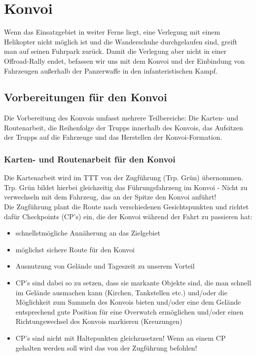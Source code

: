 \pagebreak
\section{Konvoi}
	Wenn das Einsatzgebiet in weiter Ferne liegt, eine Verlegung mit einem Helikopter nicht möglich ist und die Wanderschuhe durchgelaufen sind, greift man auf seinen Fuhrpark zurück. Damit die Verlegung aber nicht in einer Offroad-Rally endet, befassen wir uns mit dem Konvoi und der Einbindung von Fahrzeugen außerhalb der Panzerwaffe in den infanteristischen Kampf. 

\subsection{Vorbereitungen für den Konvoi}
	Die Vorbereitung des Konvois umfasst mehrere Teilbereiche: Die Karten- und Routenarbeit, die Reihenfolge der Trupps innerhalb des Konvois, das Aufsitzen der Trupps auf die Fahrzeuge und das Herstellen der Konvoi-Formation.

\subsubsection{Karten- und Routenarbeit für den Konvoi}
	Die Kartenarbeit wird im TTT von der Zugführung (Trp. Grün)  übernommen. Trp. Grün bildet hierbei gleichzeitig das Führungsfahrzeug im Konvoi - Nicht zu verwechseln mit dem Fahrzeug, das an der Spitze den Konvoi anführt! \\
	Die Zugführung plant die Route nach verschiedenen Gesichtspunkten und richtet dafür Checkpoints (CP's) ein, die der Konvoi während der Fahrt zu passieren hat: 

	\begin{itemize}
		\item schnellstmögliche Annäherung an das Zielgebiet
		\item möglichst sichere Route für den Konvoi
		\item Ausnutzung von Gelände und Tageszeit zu unserem Vorteil
		\item CP's sind dabei so zu setzen, dass sie markante Objekte sind, die man schnell im Gelände ausmachen kann (Kirchen, Tankstellen etc.) und/oder die Möglichkeit zum Sammeln des Konvois bieten und/oder eine dem Gelände entsprechend gute Position für eine Overwatch ermöglichen und/oder einen Richtungswechsel des Konvois markieren (Kreuzungen)
		\item CP's sind nicht mit Haltepunkten gleichzusetzen! Wenn an einem CP gehalten werden soll wird das von der Zugführung befohlen!
	\end{itemize}

